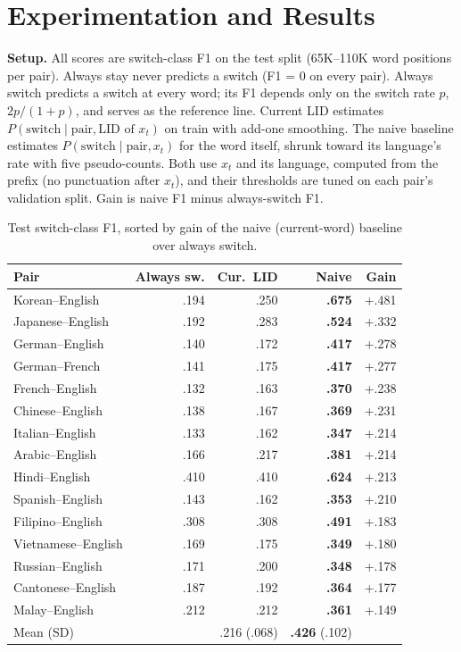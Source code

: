 \documentclass[sigconf]{acmart}
\begin{document}
\section{Experimentation and Results}
\textbf{Setup.} All scores are switch-class F1 on the test split (65K--110K
word positions per pair). Always stay never predicts a switch (F1 = 0 on every pair). Always switch predicts a switch
at every word; its F1 depends only on the switch rate $p$, $2p/(1+p)$, and serves as the reference line. Current LID
estimates $P(\text{switch}\mid\text{pair},\text{LID of }x_t)$ on train with add-one smoothing. The naive baseline
estimates $P(\text{switch}\mid\text{pair}, x_t)$ for the word itself, shrunk toward its language's rate with five
pseudo-counts. Both use $x_t$ and its language, computed from the prefix (no punctuation after $x_t$), and their thresholds are tuned on each
pair's validation split. Gain is naive F1 minus always-switch F1.

\begin{table}[t]
\caption{Test switch-class F1, sorted by gain of the naive (current-word) baseline over always switch.}
\label{tab:results}
\small
\begin{tabular}{lrrrr}
\toprule
Pair & Always sw. & Cur.\ LID & Naive & Gain\\
\midrule
Korean--English & .194 & .250 & \textbf{.675} & +.481\\
Japanese--English & .192 & .283 & \textbf{.524} & +.332\\
German--English & .140 & .172 & \textbf{.417} & +.278\\
German--French & .141 & .175 & \textbf{.417} & +.277\\
French--English & .132 & .163 & \textbf{.370} & +.238\\
Chinese--English & .138 & .167 & \textbf{.369} & +.231\\
Italian--English & .133 & .162 & \textbf{.347} & +.214\\
Arabic--English & .166 & .217 & \textbf{.381} & +.214\\
Hindi--English & .410 & .410 & \textbf{.624} & +.213\\
Spanish--English & .143 & .162 & \textbf{.353} & +.210\\
Filipino--English & .308 & .308 & \textbf{.491} & +.183\\
Vietnamese--English & .169 & .175 & \textbf{.349} & +.180\\
Russian--English & .171 & .200 & \textbf{.348} & +.178\\
Cantonese--English & .187 & .192 & \textbf{.364} & +.177\\
Malay--English & .212 & .212 & \textbf{.361} & +.149\\
\midrule
Mean (SD) & & .216 (.068) & \textbf{.426} (.102) & \\
\bottomrule
\end{tabular}
\end{table}
\end{document}
